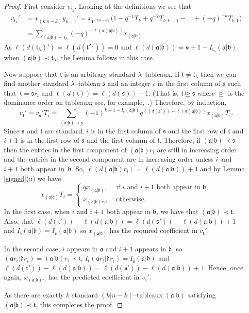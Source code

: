 \documentclass[twoside]{amsart}
\def\And{\text{\ and\ }}
\def\If{\text{\ if\ }}
\def\Otherwise{\text{\ otherwise}}
\numberwithin{equation}{section}
\theoremstyle{remark}
\let\gedom\trianglerighteq
\def\len(#1){\ell(#1)}
\def\a{\mathfrak a}
\def\b{\mathfrak b}
\def\s{\mathfrak s}
\def\t{\mathfrak t}
\begin{document}
\begin{proof}
First consider $v_{\t_\lambda}$. Looking at the definitions we see
that
\begin{align*}
v_{\t_\lambda}'&=x_{(k|n-k)}y_{k+1}'
     =x_{\t^{(k|n-k)}}\Big(1-q^{-1}T_k+q^{-2}T_{k,k-1}
                 -\dots+(-q)^{-k}T_{k,1}\Big)\\
    &=\sum_{(\a|\b)\prec\t_\lambda}(-q)^{-\len(d(\a|\b))} x_{(\a|\b)}.
\end{align*}
As $\len(d(\t_\lambda)')=\len(d(\t^{\lambda'}))=0$ and
$\len(d(\a|\b))=k+1-I_{\t_\lambda}(\a|\b)$, when
$(\a|\b)\prec\t_\lambda$, the Lemma follows in this case.

Now suppose that $\t$ is an arbitrary standard $\lambda$--tableaux.
If $\t\ne\t_\lambda$ then we can find another standard
$\lambda$--tableau $\s$ and an integer $i$ in the first column of $\s$
such that~$\t=\s r_i$ and $\len(d(\t))=\len(d(\s))-1$. (That is,
$\t\gedom\s$ where $\gedom$ is the dominance order on tableaux; see,
for example,~\cite{M:IHA}.) Therefore, by induction,  
$$v_\t'=v_\s'T_i=\sum_{(\a|\b)\prec\s}
   (-1)^{k+1-I_\s(\a|\b)}q^{\len(d(\s'))-\len(d(\a|\b))}x_{(\a|\b)}T_i.$$
Since $\s$ and $\t$ are standard, $i$ is in the first column of $\s$
and the first row of $\t$ and~$i+1$ is in the first row of $\s$ and
the first column of $\t$.  Therefore, if $(\a|\b)\prec\s$ then the
entries in the first component of $(\a|\b)r_i$ are still in increasing
order and the entries in the second component are in increasing order
unless $i$ and~$i+1$ both appear in~$\b$. So,
$\len(d(\a|\b)r_i)=\len(d(\a|\b))+1$ and by Lemma \ref{signed}(ii) we
have
$$x_{(\a|\b)}T_i=\begin{cases}
      qx_{(\a|\b)},&\If i\And i+1\text{ both appear in $\b$},\\
       x_{(\a|\b)r_i},&\Otherwise.
\end{cases}$$
In the first case, when $i$ and $i+1$ both appear in $\b$, we have
that $(\a|\b)\prec\t$. Also, that
$\len(d(\t'))-\len(d(\a|\b))=\len(d(\s'))-\len(d(\a|\b))+1$ and
$I_\t(\a|\b)=I_\s(\a|\b)$ so $x_{(\a|\b)}$ has the required
coefficient in $v_\t'$.

In the second case, $i$ appears in $\a$ and $i+1$ appears in $\b$, so 
$(\a r_i|\b r_i)=(\a|\b)r_i\prec\t$, $I_\t(\a r_i|\b r_i)=I_\s(\a|\b)$
and $\len(d(\t'))-\len(d(\a|\b))=\len(d(\s'))-\len(d(\a|\b))+1$.
Hence, once again, $x_{(\a|\b)r_i}$ has the predicted coefficient in $v_\t'$.

As there are exactly $k$ standard $(k|n-k)$--tableaux $(\a|\b)$ 
satisfying $(\a|\b)\prec\t$, this completes the proof.
\end{proof}
\end{document}
